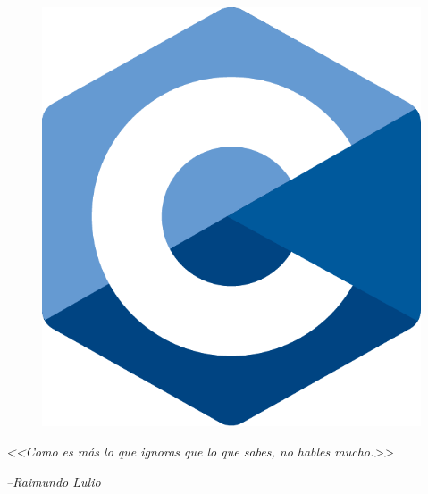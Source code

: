 \documentclass[a4paper]{article}
\title{\rm \textbf{\Huge{\titulo}}\normalfont }
\author{\LARGE{\autor}\\ \\ \Large{\organizacion}}
\begin{document}
\maketitle

\begin{figure}[H]
    \center
    \includegraphics[width=.5\linewidth]{c_icon}
\end{figure}
\newpage
\cleardoublepage
\begin{flushright}
    \textit{<<Como es más lo que ignoras que lo que sabes, no hables mucho.>>}

    \textit{--Raimundo Lulio}
\end{flushright}
\end{document}
